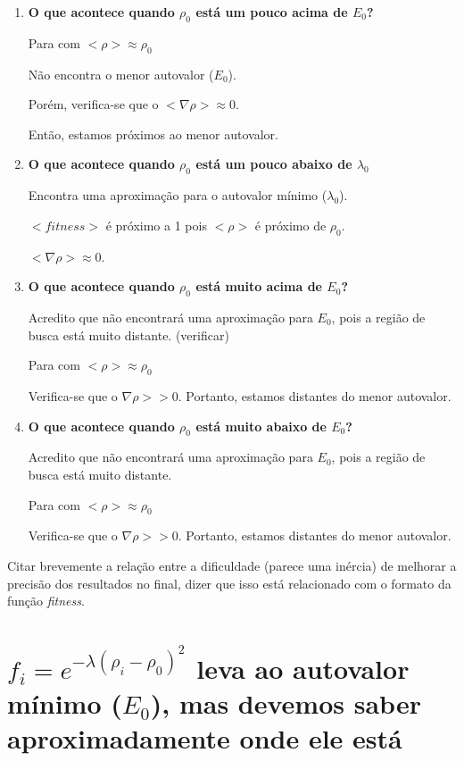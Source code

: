 	
	\begin{enumerate}
		\item \textbf{O que acontece quando $\rho_0$ está um pouco acima de $E_0$?}
		
				Para com $<\rho> \approx \rho_0$
				
				Não encontra o menor autovalor ($E_0$).
				
				Porém, verifica-se que o $<\nabla \rho> \approx 0$.
				
				Então, estamos próximos ao menor autovalor.

				
		\item \textbf{O que acontece quando $\rho_0$ está um pouco abaixo de $\lambda_0$}
						
				Encontra uma aproximação para o autovalor mínimo ($\lambda_0$).
				
				$<fitness>$ é próximo a 1 pois $<\rho>$ é próximo de $\rho_0$.
				
				$<\nabla \rho> \approx 0$.
				
						
		\item \textbf{O que acontece quando $\rho_0$ está muito acima de $E_0$?}
		
					Acredito que não encontrará uma aproximação para $E_0$, pois a região de busca está muito distante. (verificar)
					
				Para com $<\rho> \approx \rho_0$
				
				Verifica-se que o $\nabla \rho >> 0$. Portanto, estamos distantes do menor autovalor.
						
		\item \textbf{O que acontece quando $\rho_0$ está muito abaixo de $E_0$?}
				
				Acredito que não encontrará uma aproximação para $E_0$, pois a região de busca está muito distante.
				
				Para com $<\rho> \approx \rho_0$
				
				Verifica-se que o $\nabla \rho >> 0$. Portanto, estamos distantes do menor autovalor.
		
	\end{enumerate}
	
	Citar brevemente a relação entre a dificuldade (parece uma inércia) de melhorar a precisão dos resultados no final, dizer que isso está relacionado com o formato da função \textit{fitness}.

	\section{$f_i = e^{-\lambda(\rho_i - \rho_0)^2}$ leva ao autovalor mínimo ($E_0$), mas devemos saber aproximadamente onde ele está}
	

